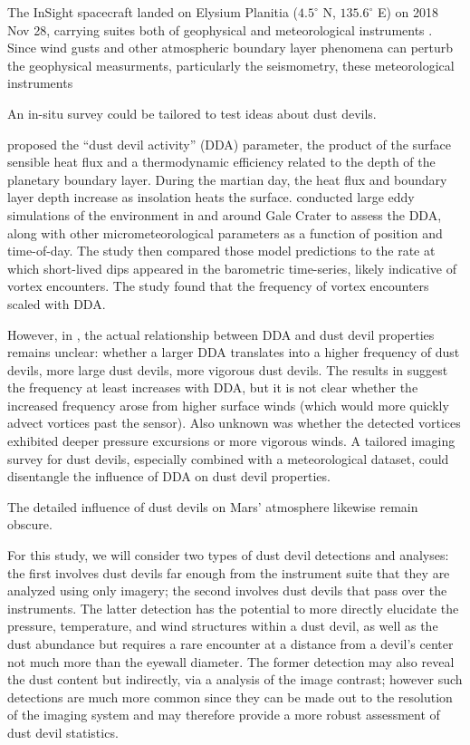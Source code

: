 \documentclass{aastex63}
\begin{document}

The InSight spacecraft landed on Elysium Planitia ($4.5^\circ$ N, $135.6^\circ$ E) on 2018 Nov 28, carrying suites both of geophysical \citep{} and meteorological instruments \citep{}. Since wind gusts and other atmospheric boundary layer phenomena can perturb the geophysical measurments, particularly the seismometry, these meteorological instruments 

An in-situ survey could be tailored to test ideas about dust devils. 

\citet{1998JAtS...55.3244R} proposed the ``dust devil activity'' (DDA) parameter, the product of the surface sensible heat flux and a thermodynamic efficiency related to the depth of the planetary boundary layer. During the martian day, the heat flux and boundary layer depth increase as insolation heats the surface. \citet{2019JGRE..124.3442N} conducted large eddy simulations of the environment in and around Gale Crater to assess the DDA, along with other micrometeorological parameters as a function of position and time-of-day. The study then compared those model predictions to the rate at which short-lived dips appeared in the barometric time-series, likely indicative of vortex encounters. The study found that the frequency of vortex encounters scaled with DDA.

However, in \citet{1998JAtS...55.3244R}, the actual relationship between DDA and dust devil properties remains unclear: whether a larger DDA translates into a higher frequency of dust devils, more large dust devils, more vigorous dust devils. The results in \citet{2019JGRE..124.3442N} suggest the frequency at least increases with DDA, but it is not clear whether the increased frequency arose from higher surface winds (which would more quickly advect vortices past the sensor). Also unknown was whether the detected vortices exhibited deeper pressure excursions or more vigorous winds. A tailored imaging survey for dust devils, especially combined with a meteorological dataset, could disentangle the influence of DDA on dust devil properties. 

The detailed influence of dust devils on Mars' atmosphere likewise remain obscure. 

For this study, we will consider two types of dust devil detections and analyses: the first involves dust devils far enough from the instrument suite that they are analyzed using only imagery; the second involves dust devils that pass over the instruments. The latter detection has the potential to more directly elucidate the pressure, temperature, and wind structures within a dust devil, as well as the dust abundance but requires a rare encounter at a distance from a devil's center not much more than the eyewall diameter. The former detection may also reveal the dust content but indirectly, via a analysis of the image contrast; however such detections are much more common since they can be made out to the resolution of the imaging system and may therefore provide a more robust assessment of dust devil statistics. 
\end{document}
